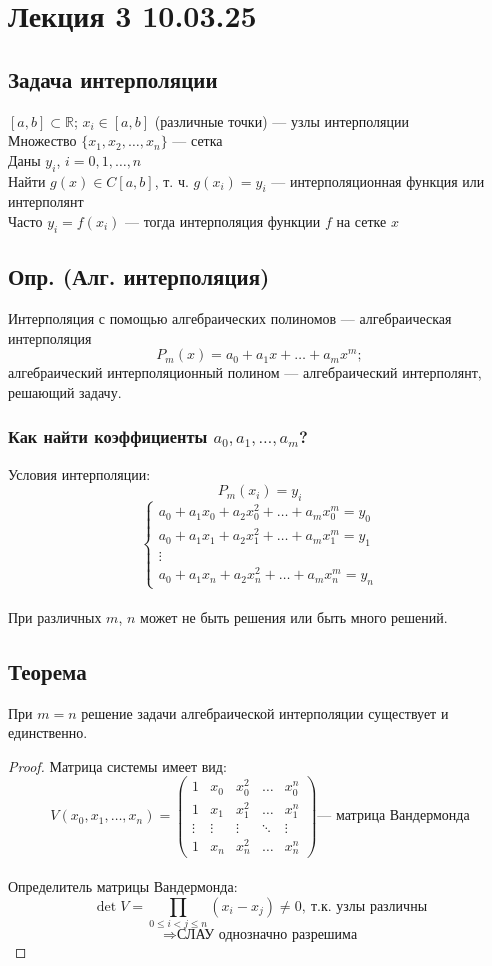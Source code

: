 \section{Лекция 3 10.03.25}

\subsection*{Задача интерполяции}
$[a, b] \subset \mathbb{R}$; $x_i \in [a, b]$ (различные точки) --- узлы интерполяции \\
Множество $\{x_1, x_2, \dots, x_n\}$ --- сетка \\
Даны $y_i$, $i = 0, 1, \dots, n$ \\
Найти $g(x) \in C[a, b]$, т. ч. $g(x_i) = y_i$ --- интерполяционная функция или интерполянт \\
Часто $y_i = f(x_i)$ --- тогда интерполяция функции $f$ на сетке $x$

\subsection*{Опр. (Алг. интерполяция)}
Интерполяция с помощью алгебраических полиномов --- алгебраическая интерполяция 
\[ 
P_m(x) = a_0 + a_1 x + \dots + a_m x^m;
\]
алгебраический интерполяционный полином --- алгебраический интерполянт, решающий задачу.

\subsubsection*{Как найти коэффициенты $a_0, a_1, \dots, a_m$?}
Условия интерполяции:
\[ P_m(x_i) = y_i \]
\[
\begin{cases} 
a_0 + a_1 x_0 + a_2 x_0^2 + \dots + a_m x_0^m = y_0 \\ 
a_0 + a_1 x_1 + a_2 x_1^2 + \dots + a_m x_1^m = y_1 \\ 
\vdots \\
a_0 + a_1 x_n + a_2 x_n^2 + \dots + a_m x_n^m = y_n 
\end{cases}
\] \\
При различных $m$, $n$ может не быть решения или быть много решений.

\subsection*{Теорема}
При $m = n$ решение задачи алгебраической интерполяции существует и единственно.

\begin{proof}
Матрица системы имеет вид:
\[ V(x_0, x_1, \dots, x_n) = \begin{pmatrix} 
1 & x_0 & x_0^2 & \dots & x_0^n \\ 
1 & x_1 & x_1^2 & \dots & x_1^n \\ 
\vdots & \vdots & \vdots & \ddots & \vdots \\ 
1 & x_n & x_n^2 & \dots & x_n^n 
\end{pmatrix} \text{--- матрица Вандермонда} \] \\
Определитель матрицы Вандермонда:
\[ \det V = \prod_{0 \leq i < j \leq n} (x_i - x_j) \neq 0, ~ \text{т.к. узлы различны} \] 
\[ \Rightarrow \text{СЛАУ однозначно разрешима} \]
\end{proof}

